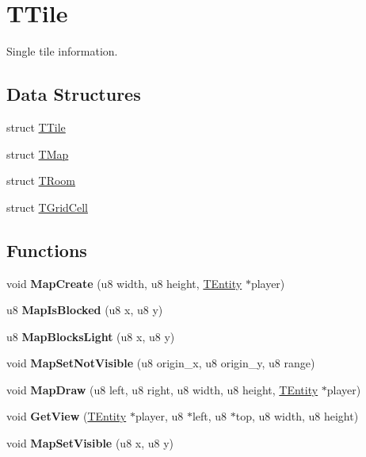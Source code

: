 \hypertarget{group__TTile}{}\section{T\+Tile}
\label{group__TTile}


Single tile information.  


\subsection*{Data Structures}
\begin{DoxyCompactItemize}
\item 
struct \mbox{\hyperlink{structTTile}{T\+Tile}}
\item 
struct \mbox{\hyperlink{structTMap}{T\+Map}}
\item 
struct \mbox{\hyperlink{structTRoom}{T\+Room}}
\item 
struct \mbox{\hyperlink{structTGridCell}{T\+Grid\+Cell}}
\end{DoxyCompactItemize}
\subsection*{Functions}
\begin{DoxyCompactItemize}
\item 
\mbox{\label{group__TTile_ga0a25d4a00a01f6a01f415c8cf22b17d2}} 
void {\bfseries Map\+Create} (u8 width, u8 height, \mbox{\hyperlink{structTEntity}{T\+Entity}} $\ast$player)
\item 
\mbox{\label{group__TTile_ga3eae0d3c0cf7368023838ed2dfc5e3c8}} 
u8 {\bfseries Map\+Is\+Blocked} (u8 x, u8 y)
\item 
\mbox{\label{group__TTile_ga4a96cfd7d7f5dab759c0274d498ca927}} 
u8 {\bfseries Map\+Blocks\+Light} (u8 x, u8 y)
\item 
\mbox{\label{group__TTile_ga806e9ea5321e82e566b161fcbd5e2e2d}} 
void {\bfseries Map\+Set\+Not\+Visible} (u8 origin\+\_\+x, u8 origin\+\_\+y, u8 range)
\item 
\mbox{\label{group__TTile_ga300f688f7b1989dba73d6bae2772a7dc}} 
void {\bfseries Map\+Draw} (u8 left, u8 right, u8 width, u8 height, \mbox{\hyperlink{structTEntity}{T\+Entity}} $\ast$player)
\item 
\mbox{\label{group__TTile_gae17467d65d599928e1b7bfa3ddeee49f}} 
void {\bfseries Get\+View} (\mbox{\hyperlink{structTEntity}{T\+Entity}} $\ast$player, u8 $\ast$left, u8 $\ast$top, u8 width, u8 height)
\item 
\mbox{\label{group__TTile_gaaf6d5d23473322d54274ad7aa393adcd}} 
void {\bfseries Map\+Set\+Visible} (u8 x, u8 y)
\end{DoxyCompactItemize}
